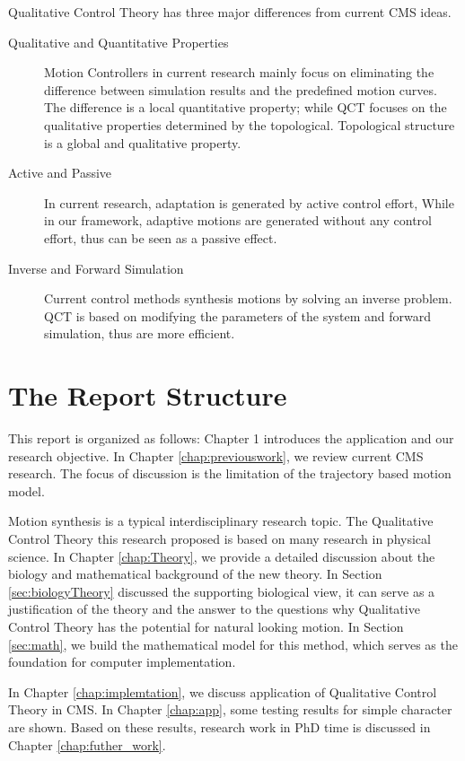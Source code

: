 Qualitative Control Theory has three major differences from current CMS ideas.  
\begin{description}
\item [Qualitative and Quantitative Properties]
Motion Controllers in current research mainly focus on eliminating the difference between simulation results and the predefined motion curves. 
The difference is a local quantitative property;
while QCT  focuses on the qualitative properties determined by the topological.
Topological structure is a global and qualitative property.


\item [Active and Passive]
In current research, adaptation is generated by active control effort, 
While in our framework, adaptive motions are generated without any control effort, 
thus can be seen as a passive effect.
\item [Inverse and Forward Simulation]
Current control methods synthesis motions by solving an inverse problem. 
QCT is based on modifying the parameters of the system and forward simulation, thus are more efficient.
\end{description}

\section{The Report Structure}

This report is organized as follows:
Chapter 1 introduces the application and our research objective.
In Chapter \ref{chap:previouswork}, we review current CMS research.
The focus of discussion is the limitation of the trajectory based motion model.


Motion synthesis is a typical interdisciplinary research topic.
The Qualitative Control Theory this research proposed is based on many research in physical science.
In Chapter \ref{chap:Theory}, we provide a detailed discussion about the biology and mathematical background of the new theory.
In Section \ref{sec:biologyTheory} discussed the supporting biological view, 
it can serve as a justification of the theory and the answer to the questions why Qualitative Control Theory has the potential for natural looking motion.
In Section \ref{sec:math}, we build the mathematical model for this method, which serves as the foundation for computer implementation.
 
In Chapter \ref{chap:implemtation}, we discuss application of Qualitative Control Theory in CMS.
In Chapter \ref{chap:app}, some testing results for simple character are shown.
Based on these results, research work in PhD time is discussed in Chapter \ref{chap:futher_work}.
 



